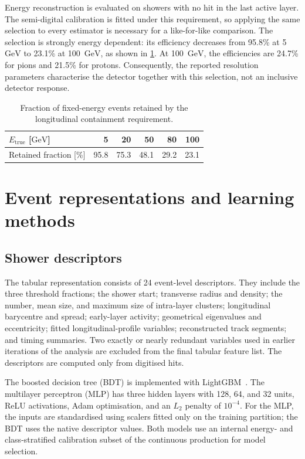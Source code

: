 \documentclass[11pt,a4paper]{article}
\newcommand{\Etrue}{\ensuremath{E_{\mathrm{true}}}}
\newcommand{\GeV}{\ensuremath{\mathrm{GeV}}}
\begin{document}
Energy reconstruction is evaluated on showers with no hit in the last active layer.
The semi-digital calibration is fitted under this requirement, so applying the same
selection to every estimator is necessary for a like-for-like comparison. The
selection is strongly energy dependent: its efficiency decreases from 95.8\% at
5~\GeV{} to 23.1\% at 100~\GeV{}, as shown in \cref{tab:containment}. At 100~\GeV{},
the efficiencies are 24.7\% for pions and 21.5\% for protons. Consequently, the
reported resolution parameters characterise the detector together with this selection,
not an inclusive detector response.

\begin{table}[tb]
  \centering
  \caption{Fraction of fixed-energy events retained by the longitudinal containment
  requirement.}
  \label{tab:containment}
  \begin{tabular}{lrrrrr}
    \toprule
    $\Etrue$ [\GeV] & 5 & 20 & 50 & 80 & 100 \\
    \midrule
    Retained fraction [\%] & 95.8 & 75.3 & 48.1 & 29.2 & 23.1 \\
    \bottomrule
  \end{tabular}
\end{table}

\section{Event representations and learning methods}
\label{sec:methods}

\subsection{Shower descriptors}

The tabular representation consists of 24 event-level descriptors. They include the
three threshold fractions; the shower start; transverse radius and density; the number,
mean size, and maximum size of intra-layer clusters; longitudinal barycentre and
spread; early-layer activity; geometrical eigenvalues and eccentricity; fitted
longitudinal-profile variables; reconstructed track segments; and timing summaries.
Two exactly or nearly redundant variables used in earlier iterations of the analysis
are excluded from the final tabular feature list. The descriptors are computed only
from digitised hits.

The boosted decision tree (BDT) is implemented with LightGBM~\cite{ke2017}. The
multilayer perceptron (MLP) has three hidden layers with 128, 64, and 32 units, ReLU
activations, Adam optimisation, and an $L_2$ penalty of $10^{-4}$. For the MLP, the
inputs are standardised using scalers fitted only on the training partition; the BDT
uses the native descriptor values. Both models use an internal energy- and
class-stratified calibration subset of the continuous production for model selection.
\end{document}
